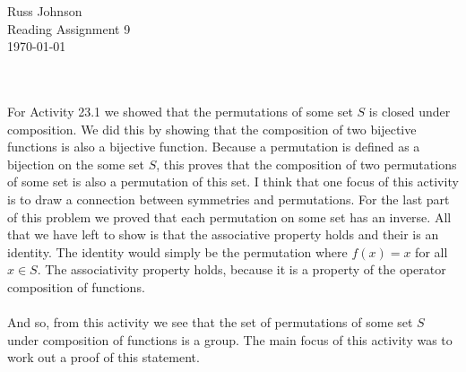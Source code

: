 \documentclass[11pt,a4paper]{article}
\begin{document}
\begin{flushright}
Russ Johnson\\
Reading Assignment 9\\
\today\\
\end{flushright}
~\\
~\\
For Activity 23.1 we showed that the permutations of some set $S$ is closed under composition. We did this by showing that the composition of two bijective functions is also a bijective function. Because a permutation is defined as a bijection on the some set $S$, this proves that the composition of two permutations of some set is also a permutation of this set. I think that one focus of this activity is to draw a connection between symmetries and permutations. For the last part of this problem we proved that each permutation on some set has an inverse. All that we have left to show is that the associative property holds and their is an identity. The identity would simply be the permutation where $f(x) = x$ for all $x\in S$. The associativity property holds, because it is a property of the operator composition of functions.\\
~\\
And so, from this activity we see that the set of permutations of some set $S$ under composition of functions is a group. The main focus of this activity was to work out a proof of this statement.
\end{document}
